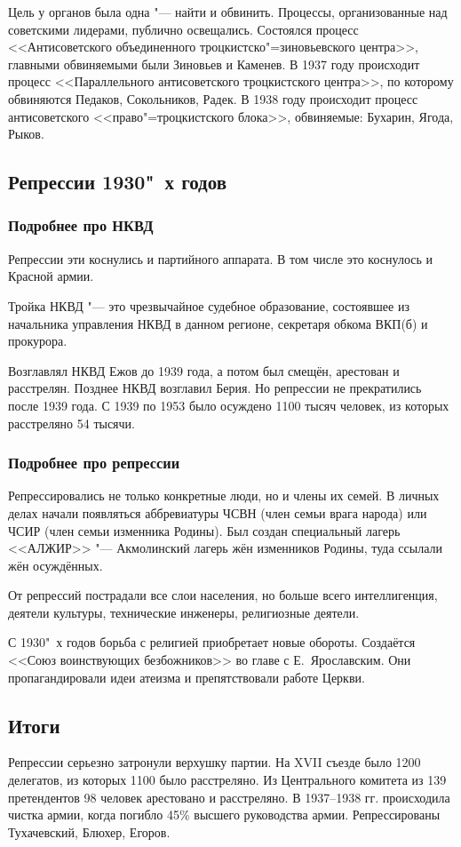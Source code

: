 Цель у органов была одна "--- найти и обвинить. Процессы, организованные над советскими лидерами, публично освещались. Состоялся процесс <<Антисоветского объединенного троцкистско"=зиновьевского центра>>, главными обвиняемыми были Зиновьев и Каменев. В 1937 году происходит процесс <<Параллельного антисоветского троцкистского центра>>, по которому обвиняются Педаков, Сокольников, Радек. В 1938 году происходит процесс антисоветского <<право"=троцкистского блока>>, обвиняемые: Бухарин, Ягода, Рыков.

\subsection{Репрессии 1930"~х годов}

\subsubsection{\textbf{Подробнее про НКВД}}

Репрессии эти коснулись и партийного аппарата. В том числе это коснулось и Красной армии.

Тройка НКВД "--- это чрезвычайное судебное образование, состоявшее из начальника управления НКВД в данном регионе, секретаря обкома ВКП(б) и прокурора.  

Возглавлял НКВД Ежов до 1939 года, а потом был смещён, арестован и расстрелян. Позднее НКВД возглавил Берия. Но репрессии не прекратились после 1939 года. С 1939 по 1953 было осуждено 1100 тысяч человек, из которых расстреляно 54 тысячи. 

\subsubsection{\textbf{Подробнее про репрессии}}

Репрессировались не только конкретные люди, но и члены их семей. В личных делах начали появляться аббревиатуры ЧСВН (член семьи врага народа) или ЧСИР (член семьи изменника Родины). Был создан специальный лагерь <<АЛЖИР>> "--- Акмолинский лагерь жён изменников Родины, туда ссылали жён осуждённых.

От репрессий пострадали все слои населения, но больше всего интеллигенция, деятели культуры, технические инженеры, религиозные деятели. 

С 1930"~х годов борьба с религией приобретает новые обороты. Создаётся <<Союз воинствующих безбожников>> во главе с Е.~Ярославским. Они пропагандировали идеи атеизма и препятствовали работе Церкви.

\subsection{Итоги}

Репрессии серьезно затронули верхушку партии. На XVII съезде было 1200 делегатов, из которых 1100 было расстреляно. Из Центрального комитета из 139 претендентов 98 человек арестовано и расстреляно. 
В 1937--1938 гг. происходила чистка армии, когда погибло 45\% высшего руководства армии. Репрессированы Тухачевский, Блюхер, Егоров. 

